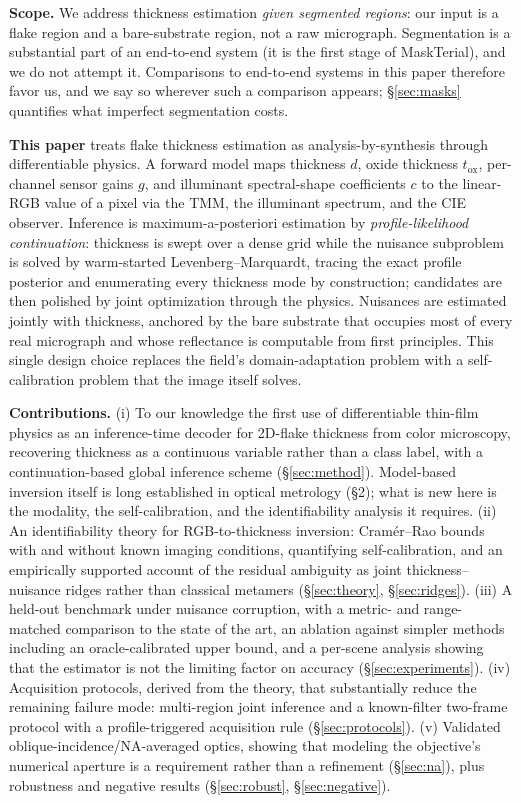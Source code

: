 \documentclass[10pt]{article}
\begin{document}
\textbf{Scope.} We address thickness estimation \emph{given segmented regions}: our input is a flake region and a bare-substrate region, not a raw micrograph. Segmentation is a substantial part of an end-to-end system (it is the first stage of MaskTerial), and we do not attempt it. Comparisons to end-to-end systems in this paper therefore favor us, and we say so wherever such a comparison appears; \S\ref{sec:masks} quantifies what imperfect segmentation costs.

\textbf{This paper} treats flake thickness estimation as analysis-by-synthesis through differentiable physics. A forward model maps thickness $d$, oxide thickness $t_{\mathrm{ox}}$, per-channel sensor gains $g$, and illuminant spectral-shape coefficients $c$ to the linear-RGB value of a pixel via the TMM, the illuminant spectrum, and the CIE observer. Inference is maximum-a-posteriori estimation by \emph{profile-likelihood continuation}: thickness is swept over a dense grid while the nuisance subproblem is solved by warm-started Levenberg--Marquardt, tracing the exact profile posterior and enumerating every thickness mode by construction; candidates are then polished by joint optimization through the physics. Nuisances are estimated jointly with thickness, anchored by the bare substrate that occupies most of every real micrograph and whose reflectance is computable from first principles. This single design choice replaces the field's domain-adaptation problem with a self-calibration problem that the image itself solves.

\textbf{Contributions.}
(i) To our knowledge the first use of differentiable thin-film physics as an inference-time decoder for 2D-flake thickness from color microscopy, recovering thickness as a continuous variable rather than a class label, with a continuation-based global inference scheme (\S\ref{sec:method}). Model-based inversion itself is long established in optical metrology (\S2); what is new here is the modality, the self-calibration, and the identifiability analysis it requires.
(ii) An identifiability theory for RGB-to-thickness inversion: Cram\'er--Rao bounds with and without known imaging conditions, quantifying self-calibration, and an empirically supported account of the residual ambiguity as joint thickness--nuisance ridges rather than classical metamers (\S\ref{sec:theory}, \S\ref{sec:ridges}).
(iii) A held-out benchmark under nuisance corruption, with a metric- and range-matched comparison to the state of the art, an ablation against simpler methods including an oracle-calibrated upper bound, and a per-scene analysis showing that the estimator is not the limiting factor on accuracy (\S\ref{sec:experiments}).
(iv) Acquisition protocols, derived from the theory, that substantially reduce the remaining failure mode: multi-region joint inference and a known-filter two-frame protocol with a profile-triggered acquisition rule (\S\ref{sec:protocols}).
(v) Validated oblique-incidence/NA-averaged optics, showing that modeling the objective's numerical aperture is a requirement rather than a refinement (\S\ref{sec:na}), plus robustness and negative results (\S\ref{sec:robust}, \S\ref{sec:negative}).
\end{document}
